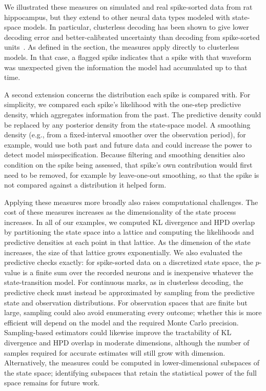 \documentclass[12pt]{article}
\begin{document}
We illustrated these measures on simulated and real spike-sorted data from rat hippocampus, but they extend to other neural data types modeled with state-space models. In particular, clusterless decoding has been shown to give lower decoding error and better-calibrated uncertainty than decoding from spike-sorted units~\cite{DengClusterlessDecodingPosition2015}. As defined in the  section, the measures apply directly to clusterless models. In that case, a flagged spike indicates that a spike with that waveform was unexpected given the information the model had accumulated up to that time.

A second extension concerns the distribution each spike is compared with. For simplicity, we compared each spike's likelihood with the one-step predictive density, which aggregates information from the past. The predictive density could be replaced by any posterior density from the state-space model. A smoothing density (e.g., from a fixed-interval smoother over the observation period), for example, would use both past and future data and could increase the power to detect model misspecification. Because filtering and smoothing densities also condition on the spike being assessed, that spike's own contribution would first need to be removed, for example by leave-one-out smoothing, so that the spike is not compared against a distribution it helped form.

Applying these measures more broadly also raises computational challenges. The cost of these measures increases as the dimensionality of the state process increases. In all of our examples, we computed KL divergence and HPD overlap by partitioning the state space into a lattice and computing the likelihoods and predictive densities at each point in that lattice. As the dimension of the state increases, the size of that lattice grows exponentially. We also evaluated the predictive checks exactly: for spike-sorted data on a discretized state space, the $p$-value is a finite sum over the recorded neurons and is inexpensive whatever the state-transition model. For continuous marks, as in clusterless decoding, the predictive check must instead be approximated by sampling from the predictive state and observation distributions. For observation spaces that are finite but large, sampling could also avoid enumerating every outcome; whether this is more efficient will depend on the model and the required Monte Carlo precision. Sampling-based estimators could likewise improve the tractability of KL divergence and HPD overlap in moderate dimensions, although the number of samples required for accurate estimates will still grow with dimension. Alternatively, the measures could be computed in lower-dimensional subspaces of the state space; identifying subspaces that retain the statistical power of the full space remains for future work.
\end{document}
